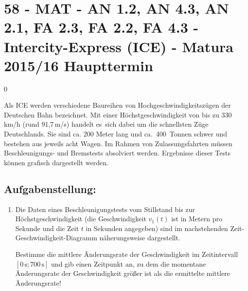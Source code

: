 \section{58 - MAT - AN 1.2, AN 4.3, AN 2.1, FA 2.3, FA 2.2, FA 4.3 - Intercity-Express (ICE) - Matura 2015/16 Haupttermin}

\begin{langesbeispiel} \item[0] %
	
Als ICE werden verschiedene Baureihen von Hochgeschwindigkeitszügen der Deutschen Bahn bezeichnet. Mit einer Höchstgeschwindigkeit von bis zu 330\,km/h (rund 91,7\,m/s) handelt es sich dabei um die schnellsten Züge Deutschlands. Sie sind ca. 200 Meter lang und ca. 400 Tonnen  schwer und bestehen aus jeweils acht Wagen. Im Rahmen von Zulassungsfahrten müssen Beschleunigungs- und Bremstests absolviert werden. Ergebnisse dieser Tests können grafisch dargestellt werden. 

\subsection{Aufgabenstellung:}
\begin{enumerate}
	\item Die Daten eines Beschleunigungstests vom Stillstand bis zur Höchstgeschwindigkeit (die Geschwindigkeit $v_1(t)$ ist in Metern pro Sekunde und die Zeit $t$ in Sekunden angegeben) sind im nachstehenden Zeit-Geschwindigkeit-Diagramm näherungsweise dargestellt.
	
	\begin{center}
\end{center}

Bestimme die mittlere Änderungsrate der Geschwindigkeit im Zeitintervall $[0\,\text{s};700\,\text{s}]$ und gib einen Zeitpunkt an, zu dem die momentane Änderungsrate der Geschwindigkeit größer ist als die ermittelte mittlere Änderungsrate!\leer


\end{enumerate}
\end{langesbeispiel}
